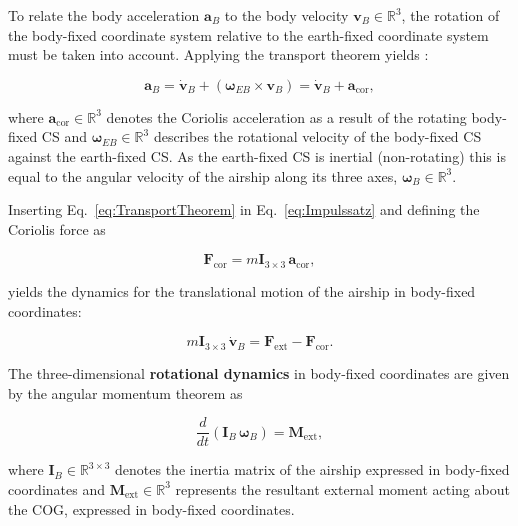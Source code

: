 To relate the body acceleration $\bm{a}_B$ to the body velocity $\bm{v}_B \in \mathbb{R}^3$, the rotation of the body-fixed coordinate system relative to the earth-fixed coordinate system must be taken into account. Applying the transport theorem yields \cite{Greenwood2003Dynamics}:

\begin{equation}
	\bm{a}_B 
	= 
	\dot{\bm{v}}_B + \left(\bm{\omega}_{EB} \times \bm{v}_B \right) 
	= 
	\dot{\bm{v}}_B + \bm{a}_\mathrm{cor},
	\label{eq:TransportTheorem}
\end{equation} 

where $\bm{a}_{\mathrm{cor}} \in \mathbb{R}^3$ denotes the Coriolis acceleration as a result of the rotating body-fixed CS and $\bm{\omega}_{EB} \in \mathbb{R}^3$ describes the rotational velocity of the body-fixed CS against the earth-fixed CS. As the earth-fixed CS is inertial (non-rotating) this is equal to the angular velocity of the airship along its three axes, $\bm{\omega}_{B} \in \mathbb{R}^3$.

Inserting Eq.~\eqref{eq:TransportTheorem} in Eq.~\eqref{eq:Impulssatz} and defining the Coriolis force as

\begin{equation}
	\bm{F}_\mathrm{cor}
	= 
	m\bm{I}_{3\times3}	\, \bm{a}_\mathrm{cor},
	\label{eq:CoriolisForce}
\end{equation}

yields the dynamics for the translational motion of the airship in body-fixed coordinates:

\begin{equation}
	m\bm{I}_{3\times3} \, \dot{\bm{v}}_B 
	= 
	\bm{F}_\mathrm{ext} - \bm{F}_\mathrm{cor}.
	\label{eq:TranslationalDynamics}
\end{equation}
%


The three-dimensional \textbf{rotational dynamics} in body-fixed coordinates are given by the angular momentum theorem as

\begin{equation}
	\frac{d}{dt} \left( \bm{I}_B \, \bm{\omega}_{B} \right)
	= 
	\bm{M}_\mathrm{ext},
	\label{eq:Drallsatz}
\end{equation}

where $\bm{I}_B \in \mathbb{R}^{3 \times 3}$ denotes the inertia matrix of the airship expressed in body-fixed coordinates and $\bm{M}_\mathrm{ext} \in \mathbb{R}^3$ represents the resultant external moment acting about the COG, expressed in body-fixed coordinates.

